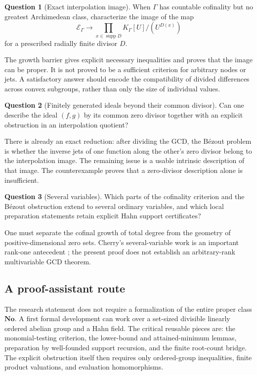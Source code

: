 \documentclass[11pt]{article}
\theoremstyle{plain}
\theoremstyle{plain}
\theoremstyle{plain}
\theoremstyle{definition}
\theoremstyle{definition}
\theoremstyle{definition}
\newtheorem{question}[question]{Question}
\theoremstyle{remark}
\newcommand{\No}{\mathbf{No}}
\newcommand{\K}{K_\Gamma}\newcommand{\E}{\mathcal E_\Gamma}
\DeclareMathOperator{\supp}{supp}\DeclareMathOperator{\lc}{lc}
\begin{document}
\begin{question}[Exact interpolation image]\label{q:image}
When $\Gamma$ has countable cofinality but no greatest Archimedean
class, characterize the image of the map
\[
 \E\longrightarrow\prod_{x\in\supp D}\K[U]/(U^{D(x)})
\]
for a prescribed radially finite divisor $D$.
\end{question}
The growth barrier gives explicit necessary inequalities and proves
that the image can be proper. It is not proved to be a sufficient
criterion for arbitrary nodes or jets. A satisfactory answer should
encode the compatibility of divided differences across convex
subgroups, rather than only the size of individual values.

\begin{question}[Finitely generated ideals beyond their common divisor]
Can one describe the ideal $(f,g)$ by its common zero divisor together
with an explicit obstruction in an interpolation quotient?
\end{question}
There is already an exact reduction: after dividing the GCD, the
B\'ezout problem is whether the inverse jets of one function along
the other's zero divisor belong to the interpolation image. The
remaining issue is a usable intrinsic description of that image.
The counterexample proves that a zero-divisor description alone is
insufficient.

\begin{question}[Several variables]
Which parts of the cofinality criterion and the B\'ezout obstruction
extend to several ordinary variables, and which local preparation
statements retain explicit Hahn support certificates?
\end{question}
One must separate the cofinal growth of total degree from the geometry
of positive-dimensional zero sets. Cherry's several-variable work is
an important rank-one antecedent \cite{Cherry}; the present proof does
not establish an arbitrary-rank multivariable GCD theorem.

\subsection{A proof-assistant route}
The research statement does not require a formalization of the entire
proper class $\No$. A first formal development can work over a
set-sized divisible linearly ordered abelian group and a Hahn field.
The critical reusable pieces are: the monomial-testing criterion,
the lower-bound and attained-minimum lemmas, preparation by
well-founded support recursion, and the finite root-count bridge.
The explicit obstruction itself then requires only ordered-group
inequalities, finite product valuations, and evaluation homomorphisms.
\end{document}
